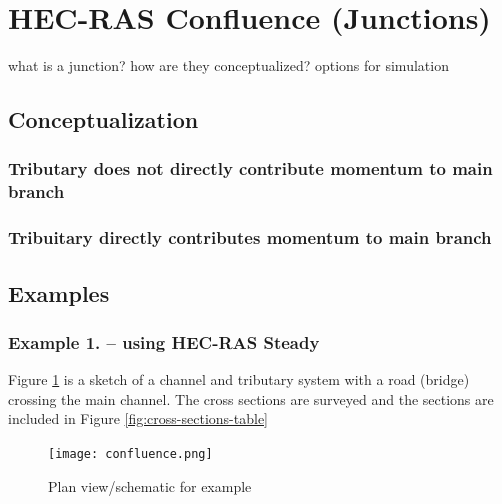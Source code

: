 \section{HEC-RAS Confluence (Junctions)}
what is a junction?
how are they conceptualized?
options for simulation 

\subsection{Conceptualization}

\subsubsection{Tributary does not directly contribute momentum to main branch }

\subsubsection{Tribuitary directly contributes momentum to main branch}


\clearpage
\subsection{Examples}
\subsubsection{Example 1. -- using HEC-RAS Steady}

Figure  \ref{fig:confluence} is a sketch of a channel and tributary system with a road (bridge) crossing the main channel.  The cross sections are surveyed and the sections are included in Figure \ref{fig:cross-sections-table}

\begin{figure}[h!] %
   \centering
   \texttt{[image: confluence.png]} 
   \caption{Plan view/schematic for example}
   \label{fig:confluence}
\end{figure}


